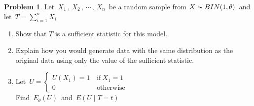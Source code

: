 \documentclass[12pt,a4paper]{report}
\theoremstyle{definition}
\newtheorem{problemx}{Problem}[section]
\newenvironment{problem}{\begin{problemx}}{\end{problemx}}
\begin{document}
\begin{problem}
Let $\, X_1\, , \, X_2\, , \, \cdots \, , \, X_n\,$  be a random sample from $X\thicksim BIN(1,\theta)\,$ and let $\, T = \sum^n_{i = 1} X_i$
\begin{enumerate}
\item[(a).] Show that $T$ is a sufficient statistic for this model.
\item[(b).] Explain how you would generate data with the same distribution as the original data using only the value of the sufficient statistic.
\item[(c).] Let $\, U = \begin{cases}
U\left(X_1\right) = 1\, & \text{if}\  X_1 = 1\\
0 & \text{otherwise}
\end{cases}
$\\
Find $\, E_{\theta}\left(U\right)\, $ and $\, E\left(U \mid T = t\right)$
\end{enumerate}
\end{problem}
\end{document}
